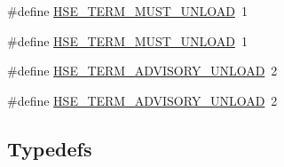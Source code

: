 \begin{DoxyCompactItemize}
\#define \hyperlink{group__MOD__ISAPI_ga604c192e9da2895d50321e96b45df1f3}{H\+S\+E\+\_\+\+T\+E\+R\+M\+\_\+\+M\+U\+S\+T\+\_\+\+U\+N\+L\+O\+AD}~1
\item 
\#define \hyperlink{group__MOD__ISAPI_ga604c192e9da2895d50321e96b45df1f3}{H\+S\+E\+\_\+\+T\+E\+R\+M\+\_\+\+M\+U\+S\+T\+\_\+\+U\+N\+L\+O\+AD}~1
\item 
\#define \hyperlink{group__MOD__ISAPI_ga89e02ed62ddd4aaf48577d4a9445bb79}{H\+S\+E\+\_\+\+T\+E\+R\+M\+\_\+\+A\+D\+V\+I\+S\+O\+R\+Y\+\_\+\+U\+N\+L\+O\+AD}~2
\item 
\#define \hyperlink{group__MOD__ISAPI_ga89e02ed62ddd4aaf48577d4a9445bb79}{H\+S\+E\+\_\+\+T\+E\+R\+M\+\_\+\+A\+D\+V\+I\+S\+O\+R\+Y\+\_\+\+U\+N\+L\+O\+AD}~2
\end{DoxyCompactItemize}
\subsection*{Typedefs}

